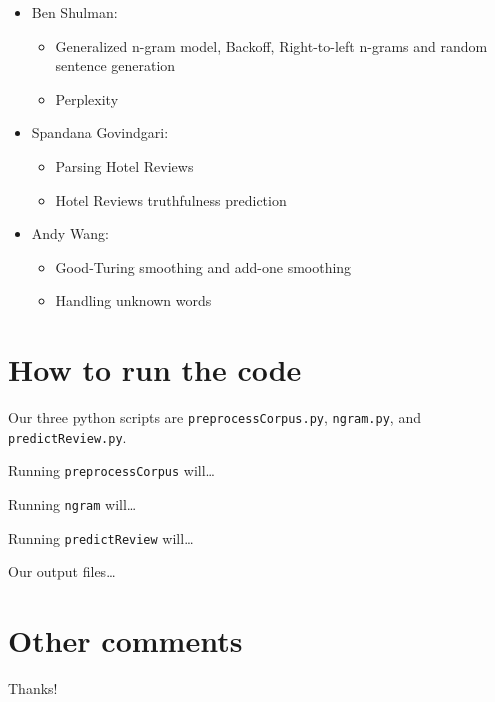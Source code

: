 \documentclass{article}
\begin{document}
\begin{itemize}[noitemsep]
\item Ben Shulman:
  \begin{itemize}[noitemsep,nolistsep]
  \item Generalized n-gram model, Backoff, Right-to-left n-grams and random sentence generation
  \item Perplexity
  \end{itemize}
\item Spandana Govindgari:
  \begin{itemize}[noitemsep,nolistsep]
  \item Parsing Hotel Reviews
  \item Hotel Reviews truthfulness prediction
  \end{itemize}
\item Andy Wang:
  \begin{itemize}[noitemsep,nolistsep]
  \item Good-Turing smoothing and add-one smoothing
  \item Handling unknown words
  \end{itemize}
\end{itemize}

\section{How to run the code}
Our three python scripts are \texttt{preprocessCorpus.py}, \texttt{ngram.py}, and \texttt{predictReview.py}.\par
Running \texttt{preprocessCorpus} will\ldots\par
Running \texttt{ngram} will\ldots\par
Running \texttt{predictReview} will\ldots\par

Our output files\ldots

\lipsum[4]

\section{Other comments}
Thanks!
\end{document}
